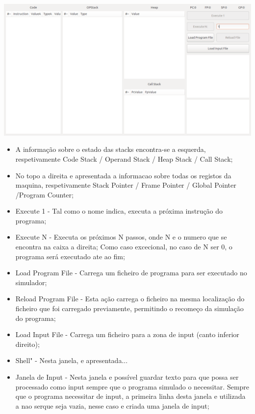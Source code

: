 \documentclass{report}
\begin{document}
	\begin{center}
	\includegraphics[width=15cm]{gtk2.png}
	\end{center}

	\begin{itemize}
		\item A informação sobre o estado das stacks encontra-se a esquerda, respetivamente
		 Code Stack / Operand Stack / Heap Stack /	Call Stack;
		\item No topo a direita e apresentada a informacao sobre todas os registos da maquina, respetivamente
			Stack Pointer / Frame Pointer /	Global Pointer /Program Counter;
		\item Execute 1 - Tal como o nome indica, executa a próxima instrução do programa;
		\item Execute N - Executa os próximos N passos, onde N e o numero que se encontra na caixa a direita; Como caso excecional,
		no caso de N ser 0, o programa será executado ate ao fim;
		\item Load Program File - Carrega um ficheiro de programa para ser executado no simulador;
		\item Reload Program File - Esta ação carrega o ficheiro na	mesma localização do ficheiro que foi carregado previamente,
		permitindo o recomeço da simulação do programa;
		\item Load Input File - Carrega um ficheiro para a zona de input (canto inferior direito);
		\item Shell" - Nesta janela, e apresentada...
		\item Janela de Input - Nesta janela e possível guardar texto para que possa ser processado como input sempre que
		o programa simulado o necessitar. Sempre que o programa necessitar de input, a primeira linha desta janela e utilizada
		a nao serque seja vazia, nesse caso e criada uma janela de input;
	\end{itemize}
\end{document}
